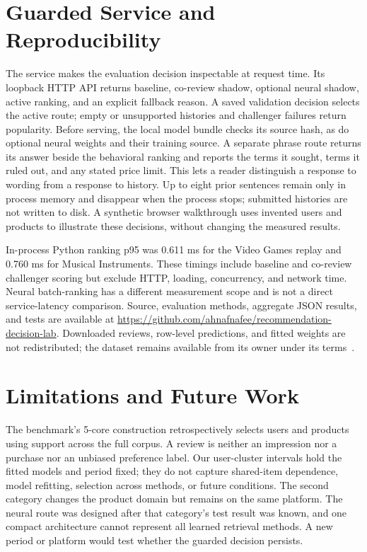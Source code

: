 \documentclass[11pt]{article}
\begin{document}
\section{Guarded Service and Reproducibility}
The service makes the evaluation decision inspectable at request time. Its loopback HTTP API returns baseline, co-review shadow, optional neural shadow, active ranking, and an explicit fallback reason. A saved validation decision selects the active route; empty or unsupported histories and challenger failures return popularity. Before serving, the local model bundle checks its source hash, as do optional neural weights and their training source. A separate phrase route returns its answer beside the behavioral ranking and reports the terms it sought, terms it ruled out, and any stated price limit. This lets a reader distinguish a response to wording from a response to history. Up to eight prior sentences remain only in process memory and disappear when the process stops; submitted histories are not written to disk. A synthetic browser walkthrough uses invented users and products to illustrate these decisions, without changing the measured results.

In-process Python ranking p95 was 0.611 ms for the Video Games replay and 0.760 ms for Musical Instruments. These timings include baseline and co-review challenger scoring but exclude HTTP, loading, concurrency, and network time. Neural batch-ranking has a different measurement scope and is not a direct service-latency comparison. Source, evaluation methods, aggregate JSON results, and tests are available at \url{https://github.com/ahnafnafee/recommendation-decision-lab}. Downloaded reviews, row-level predictions, and fitted weights are not redistributed; the dataset remains available from its owner under its terms~\cite{amazon5core}.

\section{Limitations and Future Work}
The benchmark's 5-core construction retrospectively selects users and products using support across the full corpus. A review is neither an impression nor a purchase nor an unbiased preference label. Our user-cluster intervals hold the fitted models and period fixed; they do not capture shared-item dependence, model refitting, selection across methods, or future conditions. The second category changes the product domain but remains on the same platform. The neural route was designed after that category's test result was known, and one compact architecture cannot represent all learned retrieval methods. A new period or platform would test whether the guarded decision persists.
\end{document}
